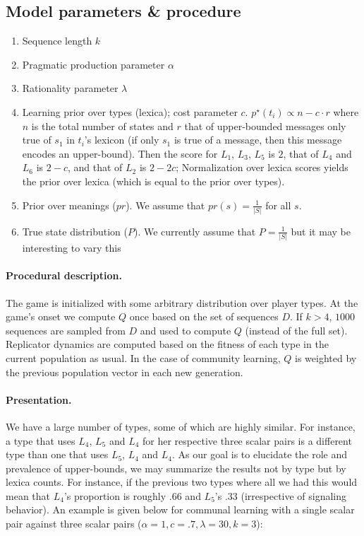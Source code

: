 \documentclass[11pt]{article}
\begin{document}
\subsection{Model parameters \& procedure} 
\begin{enumerate}
  \item Sequence length $k$
  \item Pragmatic production parameter $\alpha$
  \item Rationality parameter $\lambda$
  \item Learning prior over types (lexica); cost parameter $c$. $p^\star(t_i) \propto n - c \cdot r$ where $n$ is the total number of states and $r$ that of upper-bounded messages only true of $s_1$ in $t_i$'s lexicon (if only $s_1$ is true of a message, then this message encodes an upper-bound). Then the score for $L_1$, $L_3$, $L_5$ is $2$, that of $L_4$ and $L_6$ is $2-c$, and that of $L_2$ is $2-2c$; Normalization over lexica scores yields the prior over lexica (which is equal to the prior over types).   
  \item Prior over meanings ($pr$). We assume that $pr(s) = \frac{1}{|S|}$ for all $s$.
  \item True state distribution ($P$). We currently assume that $P = \frac{1}{|S|}$ but it may be interesting to vary this
\end{enumerate}



\paragraph{Procedural description.} The game is initialized with some arbitrary distribution over player types. At the game's onset we compute $Q$ once based on the set of sequences $D$. If $k > 4$, $1000$ sequences are sampled from $D$ and used to compute $Q$ (instead of the full set). Replicator dynamics are computed based on the fitness of each type in the current population as usual. In the case of community learning, $Q$ is weighted by the previous population vector in each new generation.

\paragraph{Presentation.} We have a large number of types, some of which are highly similar. For instance, a type that uses $L_4$, $L_5$ and $L_4$ for her respective three scalar pairs is a different type than one that uses $L_5$, $L_4$ and $L_4$. As our goal is to elucidate the role and prevalence of upper-bounds, we may summarize the results not by type but by lexica counts. For instance, if the previous two types where all we had this would mean that $L_4$'s proportion is roughly $.66$ and $L_5$'s $.33$ (irrespective of signaling behavior). An example is given below for communal learning with a single scalar pair against three scalar pairs ($\alpha = 1, c = .7, \lambda = 30, k = 3$):
\end{document}
